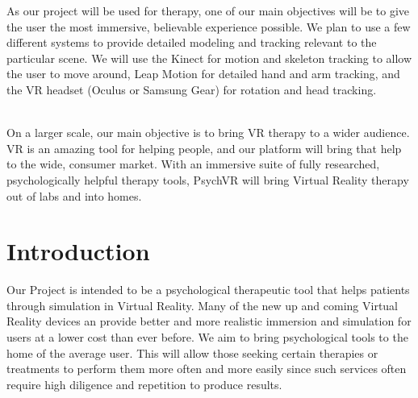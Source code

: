 \documentclass[a4paper,10pt]{article}
\begin{document}
As our project will be used for therapy, one of our main objectives will be to give the user the most immersive, believable experience possible. We plan to use a few different systems to provide detailed modeling and tracking relevant to the particular scene. We will use the Kinect for motion and skeleton tracking to allow the user to move around, Leap Motion for detailed hand and arm tracking, and the VR headset (Oculus or Samsung Gear) for rotation and head tracking. 
\par ~\\
On a larger scale, our main objective is to bring VR therapy to a wider audience.  VR is an amazing tool for helping people, and our platform will bring that help to the wide, consumer market.  With an immersive suite of fully researched, psychologically helpful therapy tools, PsychVR will bring Virtual Reality therapy out of labs and into homes.

\pagebreak
	\section{Introduction}
	Our Project is intended to be a psychological therapeutic tool that helps patients through simulation in Virtual Reality.	Many of the new up and coming Virtual Reality devices an provide better and more realistic immersion and simulation for users at a lower cost than ever before. We aim to bring psychological tools to the home of the average user. This will allow those seeking certain therapies or treatments to perform them more often and more easily since such services often require high diligence and repetition to produce results.
	
\end{document}
